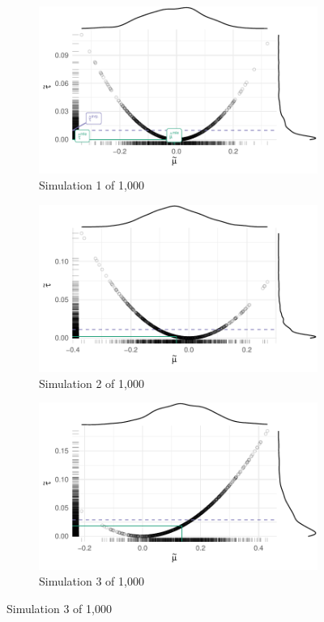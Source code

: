 \documentclass[10pt]{article}
\begin{document}
\begin{figure}
\begin{subfigure}{.5\textwidth}
  \centering
  \includegraphics[width=.8\linewidth]{figs/intuition-1.pdf}
  \caption{Simulation 1 of 1,000}
  \label{fig:int1}
\end{subfigure}%
\begin{subfigure}{.5\textwidth}
  \centering
  \includegraphics[width=.8\linewidth]{figs/intuition-2.pdf}
  \caption{Simulation 2 of 1,000}
  \label{fig:int2}
\end{subfigure}
\begin{subfigure}{.5\textwidth}
  \centering
  \includegraphics[width=.8\linewidth]{figs/intuition-3.pdf}
  \caption{Simulation 3 of 1,000}

\end{subfigure}
\end{figure}
\end{document}
